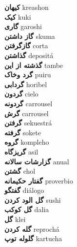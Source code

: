 \textbf{ کیهان  } kreashon \\
\textbf{ کیک  } kuki \\
\textbf{ گاری  } garoshi \\
\textbf{ گاز داشتن  } skuma \\
\textbf{ گازگرفتن  } corta \\
\textbf{ گذاشتن  } depositá \\
\textbf{ گذشته از این  } tambe \\
\textbf{ گرد وخاک  } puiru \\
\textbf{ گردابی  } horibel \\
\textbf{ گردون  } cielo \\
\textbf{ گردونه  } carrousel \\
\textbf{ گرش  } carrousel \\
\textbf{ گرفتن  } sekuestrá \\
\textbf{ گرفته  } sokete \\
\textbf{ گروه  } kompleho \\
\textbf{ گریزگاه  } asil \\
\textbf{ گزارشات سالانه  } anual \\
\textbf{ گشتن  } chol \\
\textbf{ گفتار حکیمانه  } proverbio \\
\textbf{ گفتگو  } diálogo \\
\textbf{ گل الود کردن  } sushi \\
\textbf{ گل کوکب  } dalia \\
\textbf{ گل  } klei \\
\textbf{ گله کردن  } reprochá \\
\textbf{ گلوله توپ  } kartucha \\
